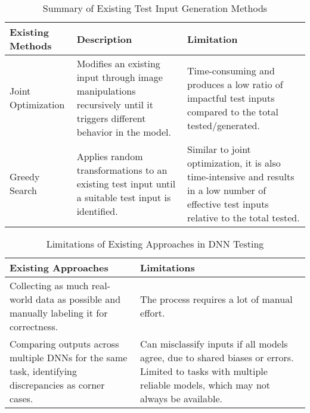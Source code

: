     


\begin{table}[h]
    \centering
    \begin{tabular}{|p{3.5cm}|p{5.5cm}|p{5.5cm}|}
    \hline
    \textbf{Existing Methods} & \textbf{Description} & \textbf{Limitation} \\
    \hline
    Joint Optimization & Modifies an existing input through image manipulations recursively until it triggers different behavior in the model. & Time-consuming and produces a low ratio of impactful test inputs compared to the total tested/generated. \\
    \hline
    Greedy Search & Applies random transformations to an existing test input until a suitable test input is identified. & Similar to joint optimization, it is also time-intensive and results in a low number of effective test inputs relative to the total tested. \\
    \hline
    \end{tabular}
    \caption{Summary of Existing Test Input Generation Methods}
    \label{table:test_input_generation_methods}
    \end{table}
    
	
\begin{table}[h]
    \centering
    \begin{tabular}{|p{6cm}|p{6cm}|}
    \hline
    \textbf{Existing Approaches} & \textbf{Limitations} \\
    \hline
    Collecting as much real-world data as possible and manually labeling it for correctness. & The process requires a lot of manual effort. \\
    \hline
    Comparing outputs across multiple DNNs for the same task, identifying discrepancies as corner cases. & Can misclassify inputs if all models agree, due to shared biases or errors. Limited to tasks with multiple reliable models, which may not always be available. \\
    \hline
    \end{tabular}
    \caption{Limitations of Existing Approaches in DNN Testing}
    \label{table:existing_approaches_limitations}
    \end{table}

